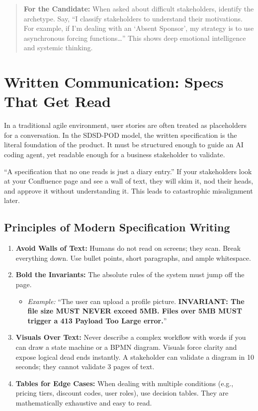\begin{quote}
\textbf{For the Candidate:} When asked about difficult stakeholders,
identify the archetype. Say, ``I classify stakeholders to understand
their motivations. For example, if I'm dealing with an `Absent Sponsor',
my strategy is to use asynchronous forcing functions\ldots{}'' This
shows deep emotional intelligence and systemic thinking.
\end{quote}

\bigskip

\section{Written Communication: Specs That Get
Read}\label{written-communication-specs-that-get-read}

In a traditional agile environment, user stories are often treated as
placeholders for a conversation. In the SDSD-POD model, the written
specification is the literal foundation of the product. It must be
structured enough to guide an AI coding agent, yet readable enough for a
business stakeholder to validate.

``A specification that no one reads is just a diary entry.'' If your
stakeholders look at your Confluence page and see a wall of text, they
will skim it, nod their heads, and approve it without understanding it.
This leads to catastrophic misalignment later.

\subsection{Principles of Modern Specification
Writing}\label{principles-of-modern-specification-writing}

\begin{enumerate}
\def\labelenumi{\arabic{enumi}.}
\tightlist
\item
  \textbf{Avoid Walls of Text:} Humans do not read on screens; they
  scan. Break everything down. Use bullet points, short paragraphs, and
  ample whitespace.
\item
  \textbf{Bold the Invariants:} The absolute rules of the system must
  jump off the page.

  \begin{itemize}
  \tightlist
  \item
    \emph{Example:} ``The user can upload a profile picture.
    \textbf{INVARIANT: The file size MUST NEVER exceed 5MB. Files over
    5MB MUST trigger a 413 Payload Too Large error.}''
  \end{itemize}
\item
  \textbf{Visuals Over Text:} Never describe a complex workflow with
  words if you can draw a state machine or a BPMN diagram. Visuals force
  clarity and expose logical dead ends instantly. A stakeholder can
  validate a diagram in 10 seconds; they cannot validate 3 pages of
  text.
\item
  \textbf{Tables for Edge Cases:} When dealing with multiple conditions
  (e.g., pricing tiers, discount codes, user roles), use decision
  tables. They are mathematically exhaustive and easy to read.
\end{enumerate}

